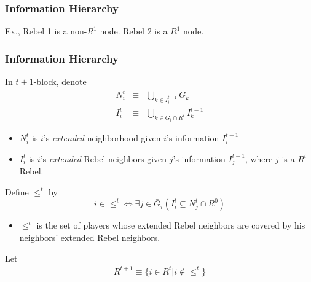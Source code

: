 \documentclass[10pt]{beamer}
\begin{document}
\begin{frame}
  \frametitle{Information Hierarchy}

Ex., Rebel 1 is a non-$R^1$ node. Rebel 2 is a $R^1$ node. 

 \begin{center}
\end{center}
\end{frame}


\begin{frame}
  \frametitle{Information Hierarchy}

In $t+1$-block, denote
\begin{eqnarray*}
N^t_i & \equiv & \bigcup_{k\in I^{t-1}_i}G_k \\
I^t_i & \equiv & \bigcup_{k\in G_i\cap R^t}I^{t-1}_k
\end{eqnarray*}
\begin{itemize}
\item $N^t_i$ is $i$'s \textit{extended} neighborhood given $i$'s information $I^{t-1}_i$
\item $I^t_i$ is $i$'s \textit{extended} Rebel neighbors given $j$'s information $I^{t-1}_j$, where $j$ is a $R^{t}$ Rebel. 
\end{itemize}


Define $\leq^t$ by
\[i\in \leq^t \Leftrightarrow \exists j\in \bar{G}_i(I^t_i\subseteq N^t_j\cap R^0)\] 
\begin{itemize}
\item $\leq^t$ is the set of players whose extended Rebel neighbors are covered by his neighbors' extended Rebel neighbors.
\end{itemize}

Let 
\begin{eqnarray*}
R^{t+1} \equiv  \{i\in R^t|i\notin \leq^t\}
\end{eqnarray*}


\end{frame}
\end{document}
